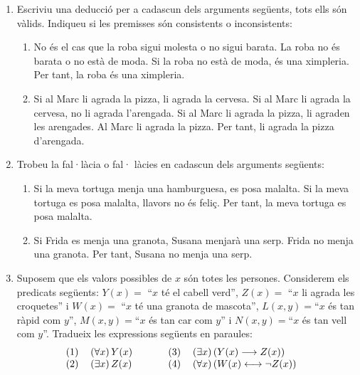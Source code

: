 \begin{enumerate}
\begin{enumerate}
\item Si $\alpha$ i $\beta$ són dos angles iguals, llavors $\alpha=45%
{{}^o}%
$. Si $\beta=45%
{{}^o}%
$, llavors $\alpha=90%
{{}^o}%
$. O $\beta$ és recte o bé $\beta=45%
{{}^o}%
$. $\beta$ no és recte. Per tant, $\alpha$ i $\beta$ no són iguals i
cap d'ells és recte.
\end{enumerate}

\item Escriviu una deducció per a cadascun dels arguments següents,
tots ells són vàlids. Indiqueu si les premisses són consistents o inconsistents:

\begin{enumerate}
\item No és el cas que la roba sigui molesta o no sigui barata. La roba no
és barata o no està de moda. Si la roba no està de moda, és
una ximpleria. Per tant, la roba és una ximpleria.

\item Si al Marc li agrada la pizza, li agrada la cervesa. Si al Marc li
agrada la cervesa, no li agrada l'arengada. Si al Marc li agrada la pizza, li
agraden les arengades. Al Marc li agrada la pizza. Per tant, li agrada la
pizza d'arengada.
\end{enumerate}

\item Trobeu la fal·làcia o fal·
làcies en cadascun dels arguments següents:

\begin{enumerate}
\item Si la meva tortuga menja una hamburguesa, es posa malalta. Si la meva
tortuga es posa malalta, llavors no és feliç. Per tant, la meva
tortuga es posa malalta.

\item Si Frida es menja una granota, Susana menjarà una serp. Frida no
menja una granota. Per tant, Susana no menja una serp.
\end{enumerate}

\item Suposem que els valors possibles de $x$ són totes les persones.
Considerem els predicats següents: $Y(x)=$ \enquote{$x$ té el cabell verd},
$Z(x)=$ \enquote{$x$ li agrada les croquetes} i $W(x)=$ \enquote{$x$ té una granota de
mascota}, $L(x,y)=$\enquote{$x$ és tan ràpid com $y$}, $M(x,y)=$\enquote{$x$ és
tan car com $y$} i $N(x,y)=$\enquote{$x$ és tan vell com $y$}. Tradueix les
expressions següents en paraules:%
\[%
\begin{tabular}
[c]{llllll}%
(1) & $\left(  \forall x\right)  Y(x)$ &  &  & (3) & $\left(  \exists
x\right)  \left(  Y(x)\longrightarrow Z(x)\right)  $\\
(2) & $\left(  \exists x\right)  Z(x)$ &  &  & (4) & $\left(  \forall
x\right)  \left(  W(x)\longleftrightarrow\lnot Z(x)\right)  $%
\end{tabular}
\ \ \ \
\]



\end{enumerate}

